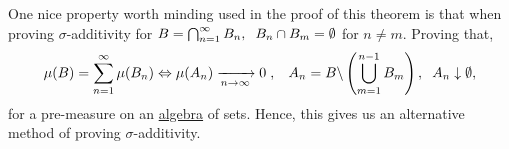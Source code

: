 \begin{remark}
    One nice property worth minding used in the proof of this theorem is that when proving $\sigma$-additivity for $B=\bigcap_{n=1}^\infty B_n,\hspace{2mm} B_n\cap B_m=\emptyset$ for $n\neq m$. Proving that, 
    \[\mu(B)=\sum_{n=1}^\infty \mu(B_n)\Leftrightarrow \mu(A_n)\xrightarrow[n\rightarrow\infty]{}0\hspace{1mm},\hspace{3mm}A_n=B\backslash \left(\bigcup_{m=1}^{n-1}B_m\right),\hspace{2mm} A_n\downarrow\emptyset,\]
    for a pre-measure on an \underline{algebra} of sets. Hence, this gives us an alternative method of proving $\sigma$-additivity.  
\end{remark}